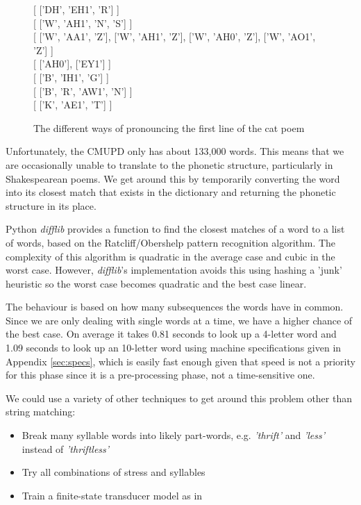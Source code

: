 \begin{figure}
\centering
{[ {['DH', 'EH1', 'R']} ]} \\
{[ {['W', 'AH1', 'N', 'S']} ]}\\
{[ {['W', 'AA1', 'Z']}, {['W', 'AH1', 'Z']}, {['W', 'AH0', 'Z']}, {['W', 'AO1', 'Z']} ]}\\
{[ {['AH0']}, {['EY1']} ]}\\
{[ {['B', 'IH1', 'G']} ]}\\
{[ {['B', 'R', 'AW1', 'N']} ]}\\
{[ {['K', 'AE1', 'T']} ]}
\caption{The different ways of pronouncing the first line of the cat poem}
\label{fig:catpronun}
\end{figure}

Unfortunately, the CMUPD only has about 133,000 words. This means that we are occasionally unable to translate to the phonetic structure, particularly in Shakespearean poems. We get around this by temporarily converting the word into its closest match that exists in the dictionary and returning the phonetic structure in its place.

Python \textit{difflib}\cite{difflib} provides a function to find the closest matches of a word to a list of words, based on the Ratcliff/Obershelp pattern recognition algorithm. The complexity of this algorithm is quadratic in the average case and cubic in the worst case. However, \textit{difflib}'s implementation avoids this using hashing a 'junk' heuristic so the worst case becomes quadratic and the best case linear. 

The behaviour is based on  how many subsequences the words have in common. Since we are only dealing with single words at a time, we have a higher chance of the best case. On average it takes 0.81 seconds to look up a 4-letter word and 1.09 seconds to look up an 10-letter word using machine specifications given in Appendix \ref{sec:specs}, which is easily fast enough given that speed is not a priority for this phase since it is a pre-processing phase, not a time-sensitive one.

We could use a variety of other techniques to get around this problem other than string matching:
\begin{itemize}
\item{Break many syllable words into likely part-words, e.g. \textit{'thrift'} and \textit{'less'} instead of \textit{'thriftless'}}
\item{Try all combinations of stress and syllables}
\item{Train a finite-state transducer model as in \cite{dobrivsek2010towards}}
\end{itemize}

